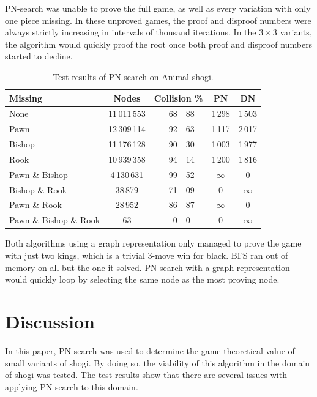 \documentclass[a4paper, 11pt]{article}
\begin{document}
PN-search was unable to prove the full game, as well as every variation with only one piece missing.
In these unproved games, the proof and disproof numbers were always strictly increasing in intervals of thousand iterations. In the $3 \times 3$ variants,
the algorithm would quickly proof the root once both proof and disproof numbers started to decline. \\

\begin{table}
\begin{tabular}{| l | c r@{.}l c c |}
\hline
 Missing & Nodes & \multicolumn{2}{c}{Collision \%} & PN & DN\\ \hline
 None                   & 11\,011\,553  & \quad~68&88 & 1\,298   & 1\,503\\
 Pawn                   & 12\,309\,114  & 92&63 & 1\,117   & 2\,017\\
 Bishop                 & 11\,176\,128  & 90&30 & 1\,003   & 1\,977\\
 Rook                   & 10\,939\,358  & 94&14 & 1\,200   & 1\,816\\
 Pawn \& Bishop         & 4\,130\,631   & 99&52 & $\infty$ & 0\\
 Bishop \& Rook         & 38\,879       & 71&09 & 0        & $\infty$\\
 Pawn \& Rook           & 28\,952       & 86&87 & $\infty$ & 0\\
 Pawn \& Bishop \& Rook & 63            & 0&0      & 0       & $\infty$\\
\hline
\end{tabular}
\caption{Test results of PN-search on Animal shogi.}
\label{animalresult}
\end{table}

Both algorithms using a graph representation only managed to prove the game with just two kings, which is a trivial 3-move win for black. BFS ran out of memory on all
but the one it solved. PN-search with a graph representation would quickly loop by selecting the same node as the most proving node.

\section{Discussion}
\label{sec:disc}
In this paper, PN-search was used to determine the game theoretical value of small variants of shogi. By doing so, the viability of this algorithm
in the domain of shogi was tested. The test results show that there are several issues with applying PN-search to this domain.
\end{document}
